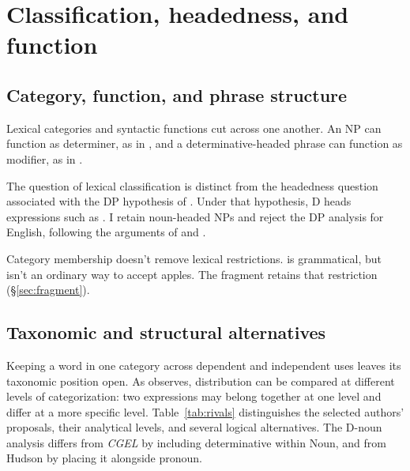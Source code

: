 \documentclass[12pt]{article}
\begin{document}
\section{Classification, headedness, and function}\label{sec:alternatives}

\subsection{Category, function, and phrase structure}\label{sec:category-function}

Lexical categories and syntactic functions cut across one another. An NP can function as determiner, as in , and a determinative-headed phrase can function as modifier, as in  \citep{payne2010,pullummiller2022nps}.

The question of lexical classification is distinct from the headedness question associated with the DP hypothesis of \textcite{abney1987}. Under that hypothesis, D heads expressions such as . I retain noun-headed NPs and reject the DP analysis for English, following the arguments of \textcite{pullummiller2022nps} and \textcite{bruening2020nominal}.

Category membership doesn't remove lexical restrictions.  is grammatical, but  isn't an ordinary way to accept apples. The fragment retains that restriction (§\ref{sec:fragment}).

\subsection{Taxonomic and structural alternatives}\label{sec:related}

Keeping a word in one category across dependent and independent uses leaves its taxonomic position open. As \textcite[232--235]{lyons1968} observes, distribution can be compared at different levels of categorization: two expressions may belong together at one level and differ at a more specific level. Table~\ref{tab:rivals} distinguishes the selected authors' proposals, their analytical levels, and several logical alternatives. The D-noun analysis differs from \textit{CGEL} by including determinative within Noun, and from Hudson by placing it alongside pronoun.
\end{document}
